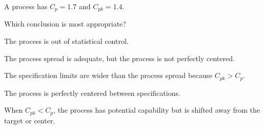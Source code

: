 
\begin{question}
A process has \(C_p=1.7\) and \(C_{pk}=1.4\).

Which conclusion is most appropriate?
\begin{answerlist}
  \item The process is out of statistical control.
  \item The process spread is adequate, but the process is not perfectly centered.
  \item The specification limits are wider than the process spread because \(C_{pk}>C_p\).
  \item The process is perfectly centered between specifications.
\end{answerlist}
\end{question}

\begin{solution}
When \(C_{pk}<C_p\), the process has potential capability but is shifted away from the target or center.
\end{solution}

